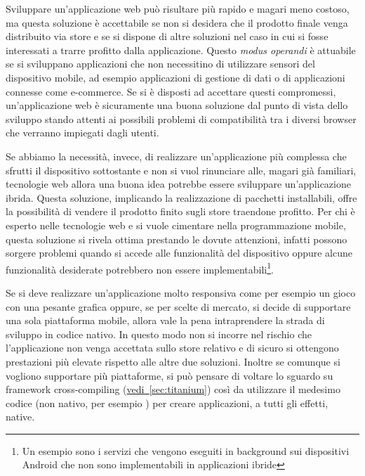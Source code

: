         Sviluppare un'applicazione web può risultare più rapido e magari meno
        costoso, ma questa soluzione è accettabile se non si desidera che il
        prodotto finale venga distribuito via \mbox{store} e se si dispone di
        altre soluzioni nel caso in cui si fosse interessati a trarre profitto
        dalla applicazione.
        Questo \textit{modus operandi} è attuabile se si sviluppano applicazioni
        che non necessitino di utilizzare sensori del dispositivo mobile, ad
        esempio applicazioni di gestione di dati o di applicazioni connesse
        come e-com\-merce. Se si è disposti ad accettare questi compromessi,
        un'applicazione web è sicuramente una buona soluzione dal punto di vista
        dello sviluppo \crossplat{} stando attenti ai possibili problemi di
        compatibilità tra i diversi \mbox{browser} che verranno impiegati dagli utenti.

        Se abbiamo la necessità, invece, di realizzare un'applicazione più
        complessa che sfrutti il dispositivo sottostante e non si vuol
        rinunciare alle, magari già familiari, tecnologie web allora una buona
        idea potrebbe essere sviluppare un'applicazione ibrida. Questa
        soluzione, implicando la realizzazione di pacchetti installabili, offre
        la possibilità di vendere il prodotto finito sugli \mbox{store} traendone
        profitto. Per chi è esperto nelle tecnologie web e si vuole cimentare
        nella programmazione mobile, questa soluzione si rivela ottima prestando
        le dovute attenzioni, infatti possono sorgere problemi quando si accede
        alle funzionalità del dispositivo oppure alcune funzionalità desiderate
        potrebbero non essere implementabili\footnote{Un esempio sono i servizi
        che vengono eseguiti in back\-ground sui dispositivi Android che non sono
        implementabili in applicazioni ibride}.

        Se si deve realizzare un'applicazione molto responsiva come per esempio
        un gioco con una pesante grafica oppure, se per scelte di mercato, si
        decide di supportare una sola piattaforma mobile, allora vale la pena
        intraprendere la strada di sviluppo in codice nativo. In questo modo non
        si incorre nel rischio che l'applicazione non venga accettata sullo
        \mbox{store} relativo e di sicuro si ottengono prestazioni più elevate rispetto
        alle altre due soluzioni. Inoltre se comunque si vogliono supportare più
        piattaforme, si può pensare di voltare lo sguardo su frame\-work
        cross-com\-pil\-ing (\hyperref[sec:titanium]{vedi~\ref{sec:titanium}}) così
        da utilizzare il medesimo codice (non nativo, per esempio \js{})
        per creare applicazioni, a tutti gli effetti, native.

